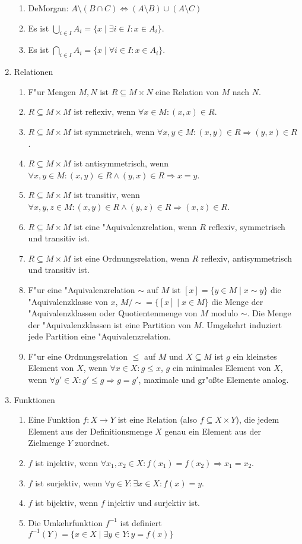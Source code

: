 \begin{enumerate}
\begin{enumerate}
    \item DeMorgan: $A\setminus (B\cap C) \Leftrightarrow (A\setminus B) \cup (A\setminus C)$
    \item Es ist $\bigcup_{i\in I}A_i = \{x\mid \exists i\in I: x\in A_i\}$. 
    \item Es ist $\bigcap_{i\in I}A_i = \{x\mid\forall i\in I: x\in A_i\}$.
\end{enumerate}
\item Relationen
\begin{enumerate}
    \item F"ur Mengen $M,N$ ist $R\subseteq M\times N$ eine Relation von $M$ nach $N$.
    \item $R\subseteq M\times M$ ist reflexiv, wenn $\forall x\in M: (x,x)\in R$.
    \item $R\subseteq M\times M$ ist symmetrisch, wenn $\forall x,y\in M: (x,y)\in R \Rightarrow (y,x)\in R$.
    \item $R\subseteq M\times M$ ist antisymmetrisch, wenn $\forall x,y\in M: (x,y)\in R \wedge (y,x)\in R \Rightarrow x=y$.
    \item $R\subseteq M\times M$ ist transitiv, wenn $\forall x,y,z\in M: (x,y)\in R \wedge (y,z)\in R \Rightarrow (x,z)\in R$.
    \item $R\subseteq M\times M$ ist eine "Aquivalenzrelation, wenn $R$ reflexiv, symmetrisch und transitiv ist.
    \item $R\subseteq M\times M$ ist eine Ordnungsrelation, wenn $R$ reflexiv, antisymmetrisch und transitiv ist.
    \item F"ur eine "Aquivalenzrelation $\sim$ auf $M$ ist $[x]=\{y\in M\mid x\sim y\}$ die "Aquivalenzklasse von $x$, $M/\sim = \{[x]\mid x\in M\}$ die Menge der "Aquivalenzklassen oder Quotientenmenge von $M$ modulo $\sim$. Die Menge der "Aquivalenzklassen ist eine Partition von $M$. Umgekehrt induziert jede Partition eine "Aquivalenzrelation.
    \item F"ur eine Ordnungsrelation $\leq$ auf $M$ und $X\subseteq M$ ist $g$ ein kleinstes Element von $X$, wenn $\forall x\in X: g\leq x$, $g$ ein minimales Element von $X$, wenn $\forall g'\in X: g'\leq g\Rightarrow g=g'$, maximale und gr"o{\ss}te Elemente analog.
\end{enumerate}
\item Funktionen
\begin{enumerate}
    \item Eine Funktion $f:X\to Y$ ist eine Relation (also $f\subseteq X\times Y$), die jedem Element aus der Definitionsmenge $X$ genau ein Element aus der Zielmenge $Y$ zuordnet.
    \item $f$ ist injektiv, wenn $\forall x_1,x_2\in X: f(x_1)=f(x_2) \Rightarrow x_1=x_2$.
    \item $f$ ist surjektiv, wenn $\forall y\in Y: \exists x\in X: f(x)=y$.
    \item $f$ ist bijektiv, wenn $f$ injektiv und surjektiv ist.
    \item Die Umkehrfunktion $f^{-1}$ ist definiert $f^{-1}(Y)=\{x\in X\mid\exists y\in Y: y=f(x)\}$
\end{enumerate}
\end{enumerate}
